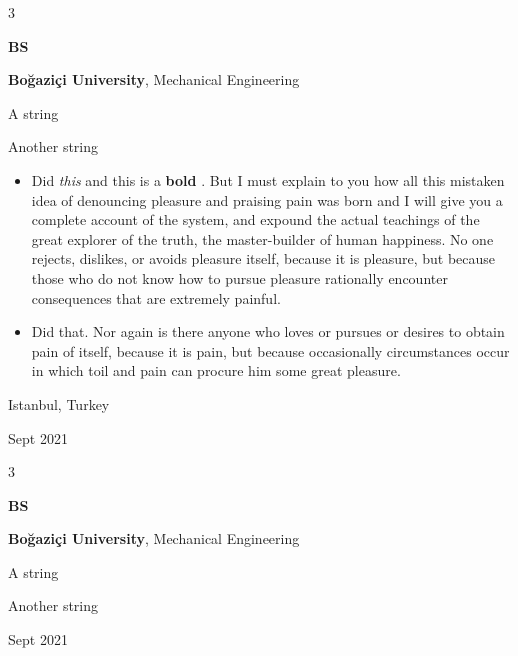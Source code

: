 \documentclass[10pt, letterpaper]{article}
\newenvironment{summary}{
    \begin{description}[
        topsep=0.10 cm,
        parsep=0.10 cm,
        partopsep=0pt,
        itemsep=0pt,
        leftmargin=0.4 cm + 10pt
    ]
}{
    \end{description}
} %
\newenvironment{highlights}{
    \begin{itemize}[
        topsep=0.10 cm,
        parsep=0.10 cm,
        partopsep=0pt,
        itemsep=0pt,
        leftmargin=0.4 cm + 10pt
    ]
}{
    \end{itemize}
} %
\newenvironment{threecolentry}[3][]{
    \onecolentry
    \def\thirdColumn{#3}
    \setcolumnwidth{1 cm, \fill, 4.5 cm}
    \begin{paracol}{3}
    {\raggedright #2} \switchcolumn
}{
    \switchcolumn \raggedleft \thirdColumn
    \end{paracol}
    \endonecolentry
} %
\let\hrefWithoutArrow\href
\renewcommand{\href}[2]{\hrefWithoutArrow{#1}{\ifthenelse{\equal{#2}{}}{ }{#2 }\raisebox{.15ex}{\footnotesize \faExternalLink*}}}
\begin{document}
        \begin{threecolentry}{\textbf{BS}}{
            Istanbul, Turkey

        Sept 2021
        }
            \textbf{Boğaziçi University}, Mechanical Engineering
            \begin{summary}
                \item A string
                \item Another string
            \end{summary}
            \begin{highlights}
                \item Did \textit{this} and this is a \textbf{bold} \href{https://example.com}{link}. But I must explain to you how all this mistaken idea of denouncing pleasure and praising pain was born and I will give you a complete account of the system, and expound the actual teachings of the great explorer of the truth, the master-builder of human happiness. No one rejects, dislikes, or avoids pleasure itself, because it is pleasure, but because those who do not know how to pursue pleasure rationally encounter consequences that are extremely painful.
                \item Did that. Nor again is there anyone who loves or pursues or desires to obtain pain of itself, because it is pain, but because occasionally circumstances occur in which toil and pain can procure him some great pleasure.
            \end{highlights}
        \end{threecolentry}

        \vspace{0.2 cm}

        \begin{threecolentry}{\textbf{BS}}{
            Sept 2021
        }
            \textbf{Boğaziçi University}, Mechanical Engineering
            \begin{summary}
                \item A string
                \item Another string
            \end{summary}
        \end{threecolentry}

        \vspace{0.2 cm}
\end{document}
